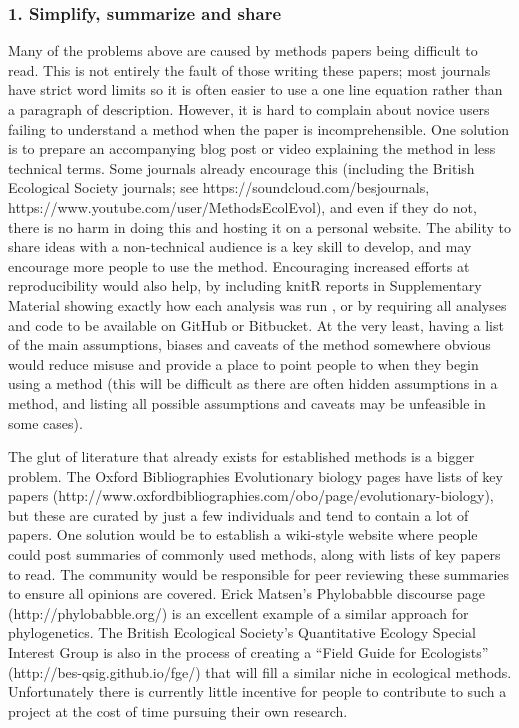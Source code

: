 \documentclass[a4paper,12pt]{article}
\begin{document}
  \subsubsection{1. Simplify, summarize and share}
    Many of the problems above are caused by methods papers being difficult to read. 
    This is not entirely the fault of those writing these papers; most journals have strict word limits so it is often easier to use a one line equation rather than a paragraph of description. 
    However, it is hard to complain about novice users failing to understand a method when the paper is incomprehensible.
    One solution is to prepare an accompanying blog post or video explaining the method in less technical terms. 
    Some journals already encourage this (including the British Ecological Society journals; see https://soundcloud.com/besjournals, https://www.youtube.com/user/MethodsEcolEvol), and even if they do not, there is no harm in doing this and hosting it on a personal website. 
    The ability to share ideas with a non-technical audience is a key skill to develop, and may encourage more people to use the method.
    Encouraging increased efforts at reproducibility would also help, by including knitR \citep{Xie:2015aa} reports in Supplementary Material showing exactly how each analysis was run \citep[e.g.][]{fitzjohn2014much}, or by requiring all analyses and code to be available on GitHub or Bitbucket. 
    At the very least, having a list of the main assumptions, biases and caveats of the method somewhere obvious would reduce misuse and provide a place to point people to when they begin using a method (this will be difficult as there are often hidden assumptions in a method, and listing all possible assumptions and caveats may be unfeasible in some cases).

    The glut of literature that already exists for established methods is a bigger problem.
    The Oxford Bibliographies Evolutionary biology pages have lists of key papers (http://www.oxfordbibliographies.com/obo/page/evolutionary-biology), but these are curated by just a few individuals and tend to contain a lot of papers. 
    One solution would be to establish a wiki-style website where people could post summaries of commonly used methods, along with lists of key papers to read. 
    The community would be responsible for peer reviewing these summaries to ensure all opinions are covered. 
    Erick Matsen's Phylobabble discourse page (http://phylobabble.org/) is an excellent example of a similar approach for phylogenetics. 
    The British Ecological Society's Quantitative Ecology Special Interest Group is also in the process of creating a ``Field Guide for Ecologists'' (http://bes-qsig.github.io/fge/) that will fill a similar niche in ecological methods.
    Unfortunately there is currently little incentive for people to contribute to such a project at the cost of time pursuing their own research.\\
\end{document}
